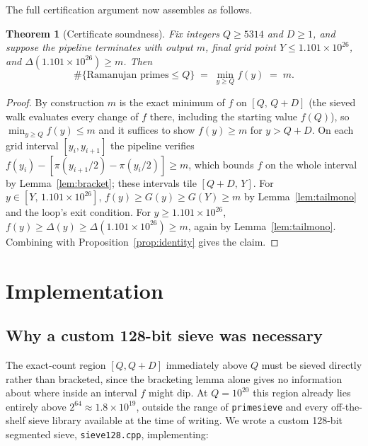 \documentclass[11pt]{amsart}
\newtheorem{theorem}{Theorem}
\newcommand{\pcount}{\pi}
\begin{document}
The full certification argument now assembles as follows.

\begin{theorem}[Certificate soundness]
\label{thm:sound}
Fix integers $Q \geq 5314$ and $D \geq 1$, and suppose the pipeline
terminates with output $m$, final grid point $Y \leq 1.101\times10^{26}$,
and $\Delta(1.101\times10^{26}) \geq m$. Then
\[
  \#\{\text{Ramanujan primes} \leq Q\} \;=\; \min_{y \geq Q} f(y) \;=\; m.
\]
\end{theorem}

\begin{proof}
By construction $m$ is the exact minimum of $f$ on $[Q,\,Q+D]$ (the
sieved walk evaluates every change of $f$ there, including the starting
value $f(Q)$), so $\min_{y\geq Q} f(y) \leq m$ and it suffices to show
$f(y) \geq m$ for $y > Q+D$. On each grid interval $[y_i, y_{i+1}]$ the
pipeline verifies $f(y_i) - [\pcount(y_{i+1}/2) - \pcount(y_i/2)] \geq
m$, which bounds $f$ on the whole interval by
Lemma~\ref{lem:bracket}; these intervals tile $[Q+D,\,Y]$. For
$y \in [Y,\,1.101\times10^{26}]$, $f(y) \geq G(y) \geq G(Y) \geq m$ by
Lemma~\ref{lem:tailmono} and the loop's exit condition. For
$y \geq 1.101\times10^{26}$, $f(y) \geq \Delta(y) \geq
\Delta(1.101\times10^{26}) \geq m$, again by Lemma~\ref{lem:tailmono}.
Combining with Proposition~\ref{prop:identity} gives the claim.
\end{proof}

\section{Implementation}
\label{sec:implementation}

\subsection{Why a custom 128-bit sieve was necessary}

The exact-count region $[Q, Q+D]$ immediately above $Q$ must be sieved
directly rather than bracketed, since the bracketing lemma alone gives no
information about where inside an interval $f$ might dip. At
$Q=10^{20}$ this region already lies entirely above $2^{64} \approx
1.8\times10^{19}$, outside the range of \texttt{primesieve} and every
off-the-shelf sieve library available at the time of writing. We wrote a
custom 128-bit segmented sieve, \texttt{sieve128.cpp}, implementing:
\end{document}
